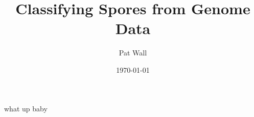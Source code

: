 \documentclass[12pt]{article}
\title{Classifying Spores from Genome Data}
\author{Pat Wall}
\date{\today}
\begin{document}
\maketitle

what up baby

\printbibliography
\end{document}
